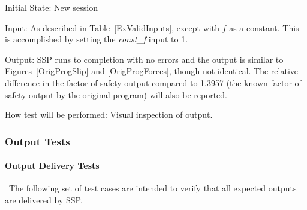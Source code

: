 \documentclass[12pt, titlepage]{article}
\newcommand{\progname}{SSP}
\begin{document}
\begin{enumerate}[label=TC\arabic*:,ref={\arabic*}]
Initial State: New session

Input: As described in Table~\ref{ExValidInputs}, except with $f$ as a 
constant. This is accomplished by setting the \textit{const\_f} input to 1.

Output: \progname{} runs to completion with no errors and the output is similar 
to Figures~\ref{OrigProgSlip} and \ref{OrigProgForces}, though not identical. 
The relative difference in the factor of safety output compared to 1.3957 (the 
known factor of safety output by the original program) will also be reported.

How test will be performed: Visual inspection of output.

\end{enumerate}




\subsubsection{Output Tests}

\paragraph{Output Delivery Tests}

~\newline \noindent The following set of test cases are intended to 
verify that all expected outputs are delivered by \progname{}.
\end{document}

